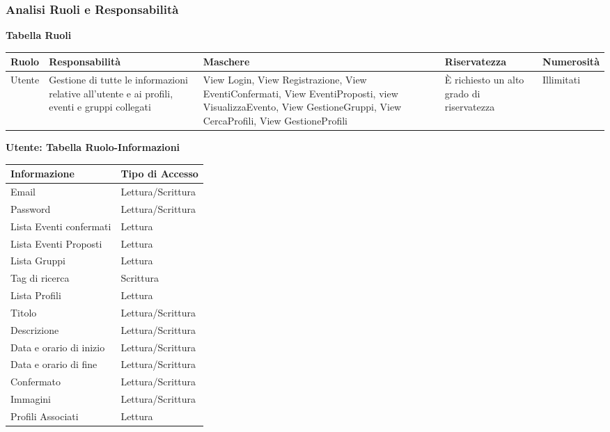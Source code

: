 \newpage
\subsubsection{Analisi Ruoli e Responsabilità}
\hfill \break

\textbf{Tabella Ruoli}
\hfill \break

\begin{tabular} {|P{2.5cm}|P{3cm}|P{4cm}|P{3cm}|P{2.5cm}|}
    \hline
    \textbf{Ruolo} & \textbf{Responsabilità}                                                                       & \textbf{Maschere}                                                                                                                                               & \textbf{Riservatezza}                     & \textbf{Numerosità} \\
    \hline
    Utente         & Gestione di tutte le informazioni relative all'utente e ai profili, eventi e gruppi collegati & View Login, View Registrazione, View EventiConfermati, View EventiProposti, view VisualizzaEvento, View GestioneGruppi, View CercaProfili, View GestioneProfili & È richiesto un alto grado di riservatezza & Illimitati          \\
    \hline
\end{tabular}
\hfill \break


\textbf{Utente: Tabella Ruolo-Informazioni}
\hfill \break

\begin{tabular} {|P{7cm}|P{7cm}|}
    \hline
    \textbf{Informazione}   & \textbf{Tipo di Accesso} \\
    \hline
    Email                   & Lettura/Scrittura        \\
    \hline
    Password                & Lettura/Scrittura        \\
    \hline
    Lista Eventi confermati & Lettura                  \\
    \hline
    Lista Eventi Proposti   & Lettura                  \\
    \hline
    Lista Gruppi            & Lettura                  \\
    \hline
    Tag di ricerca          & Scrittura                \\
    \hline
    Lista Profili           & Lettura                  \\
    \hline
    Titolo                  & Lettura/Scrittura        \\
    \hline
    Descrizione             & Lettura/Scrittura        \\
    \hline
    Data e orario di inizio & Lettura/Scrittura        \\
    \hline
    Data e orario di fine   & Lettura/Scrittura        \\
    \hline
    Confermato              & Lettura/Scrittura        \\
    \hline
    Immagini                & Lettura/Scrittura        \\
    \hline
    Profili Associati       & Lettura                  \\
    \hline
\end{tabular}
\hfill \break
\hfill \break
\newpage

